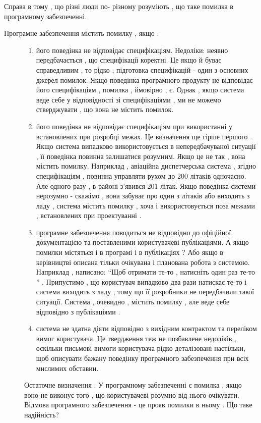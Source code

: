 \documentclass[oneside,final,14pt]{extreport}
\begin{document}
Справа в тому , що різні люди по- різному розуміють , що таке помилка в програмному забезпеченні.
\begin{description}
\item[{Програмне забезпечення містить помилку , якщо :}] \leavevmode\begin{enumerate}
\item {} 
його поведінка не відповідає специфікаціям. Недоліки: неявно передбачається , що специфікації коректні. Це якщо й буває справедливим , то рідко ; підготовка специфікацій - один з основних джерел помилок. Якщо поведінка програмного продукту не відповідає його специфікаціям , помилка , ймовірно , є. Однак , якщо система веде себе у відповідності зі специфікаціями , ми не можемо стверджувати , що вона не містить помилок.

\item {} 
його поведінка не відповідає специфікаціям при використанні у встановлених при розробці межах. Це визначення ще гірше першого . Якщо система випадково використовується в непередбачуваної ситуації , її поведінка повинна залишатися розумним. Якщо це не так , вона містить помилку. Наприклад , авіаційна диспетчерська система , згідно специфікаціям , повинна управляти рухом до 200 літаків одночасно. Але одного разу , в районі з'явився 201 літак. Якщо поведінка системи нерозумно - скажімо , вона забуває про один з літаків або виходить з ладу , система містить помилку , хоча і використовується поза межами , встановлених при проектуванні .

\item {} 
програмне забезпечення поводиться не відповідно до офіційної документацією та поставленими користувачеві публікаціями. А якщо помилки містяться і в програмі і в публікаціях ? Або якщо в керівництві описана тільки очікувана і планована робота з системою. Наприклад , написано: ``Щоб отримати те-то , натисніть один раз те-то '' . Припустимо , що користувач випадково два рази натискає те-то і система виходить з ладу , тому що її розробники не передбачили такої ситуації. Система , очевидно , містить помилку , але веде себе відповідно з публікаціями .

\item {} 
система не здатна діяти відповідно з вихідним контрактом та переліком вимог користувача.    Це твердження теж не позбавлене недоліків , оскільки письмові вимоги користувача рідко деталізовані настільки, щоб описувати бажану поведінку програмного забезпечення при всіх мислимих обставин.

\end{enumerate}

Остаточне визначення :
У програмному забезпеченні є помилка , якщо воно не виконує того , що користувачеві розумно від нього очікувати. Відмова програмного забезпечення - це прояв помилки в ньому .
Що таке надійність?

\end{description}
\end{document}
